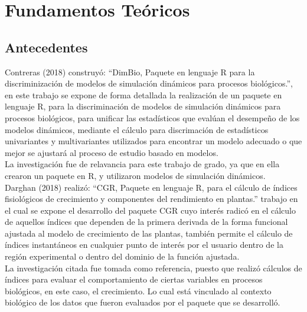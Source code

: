 \chapter{Fundamentos Te\'oricos}

\section{Antecedentes}

Contreras (2018)  construy\'o: “DimBio, Paquete en lenguaje R para la discriminizaci\'on de modelos de simulaci\'on din\'amicos para procesos biol\'ogicos.”, en este trabajo se expone de forma detallada la realizaci\'on de un paquete en lenguaje R, para la discriminaci\'on de modelos de simulaci\'on din\'amicos para procesos biol\'ogicos, para unificar las estad\'isticos que eval\'uan el desempeño de los modelos din\'amicos, mediante el c\'alculo para discrimaci\'on de estad\'isticos univariantes y multivariantes utilizados para encontrar un modelo adecuado o que mejor se ajustar\'a al proceso de estudio basado en modelos.\\ 

La investigaci\'on fue de relavancia para este trabajo de grado, ya que en ella crearon un paquete en R, y utilizaron modelos de simulaci\'on din\'amicos.\\

Darghan (2018) realiz\'o: “CGR, Paquete en lenguaje R, para el c\'alculo de índices fisiol\'ogicos de crecimiento y componentes del rendimiento en plantas.” trabajo en el cual se expone el desarrollo del paquete CGR cuyo inter\'es radic\'o en el c\'alculo de aquellos índices que dependen de la primera derivada de la forma funcional ajustada al modelo de crecimiento de las plantas, tambi\'en permite el c\'alculo de índices instant\'aneos en cualquier punto de inter\'es por el usuario dentro de la regi\'on experimental o dentro del dominio de la funci\'on ajustada.\\

La investigaci\'on citada fue tomada como referencia, puesto que realiz\'o c\'alculos de índices para evaluar el comportamiento de ciertas variables en procesos biol\'ogicos, en este caso, el crecimiento. Lo cual est\'a vinculado al contexto biol\'ogico de los datos que fueron evaluados por el paquete que se desarroll\'o.\\

